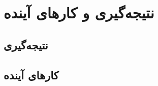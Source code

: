 \chapter{نتیجه‌گیری و کا‌ر‌های آینده}
\label{chap:conclusion}

\section{نتیجه‌گیری}


\section{کارهای آینده}